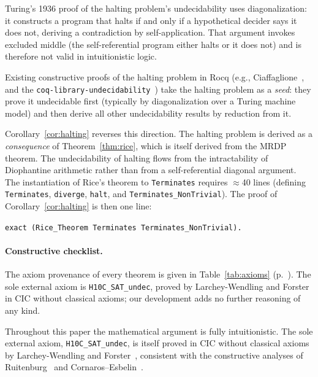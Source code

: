 \documentclass{lmcs}
\begin{document}
\begin{rem}
Turing's 1936 proof of the halting problem's undecidability uses
diagonalization: it constructs a program that halts if and only if
a hypothetical decider says it does not, deriving a contradiction
by self-application. That argument invokes excluded middle (the
self-referential program either halts or it does not) and is
therefore not valid in intuitionistic logic.

Existing constructive proofs of the halting problem in Rocq (e.g.,
Ciaffaglione~\cite{ciaffaglione2004}, and the
\texttt{coq-library-undecidability}~\cite{larchey2022}) take the
halting problem as a \emph{seed}: they prove it undecidable first
(typically by diagonalization over a Turing machine model) and then
derive all other undecidability results by reduction from it.

Corollary~\ref{cor:halting} reverses this direction. The halting
problem is derived as a \emph{consequence} of Theorem~\ref{thm:rice},
which is itself derived from the MRDP theorem. The undecidability of
halting flows from the intractability of Diophantine arithmetic rather
than from a self-referential diagonal argument. The instantiation of Rice's theorem to
\texttt{Terminates} requires $\approx$40 lines (defining
\texttt{Terminates}, \texttt{diverge}, \texttt{halt}, and
\texttt{Terminates\_NonTrivial}).
The proof of Corollary~\ref{cor:halting} is then one line:
\begin{center}
\texttt{exact (Rice\_Theorem Terminates Terminates\_NonTrivial).}
\end{center}
\end{rem}

\paragraph*{Constructive checklist.}
The axiom provenance of every theorem is given in Table~\ref{tab:axioms}
(p.~\pageref{tab:axioms}). The sole external axiom is
\texttt{H10C\_SAT\_undec}, proved by Larchey-Wendling and
Forster~\cite{larchey2022} in CIC without classical axioms; our
development adds no further reasoning of any kind.

Throughout this paper the mathematical argument is fully intuitionistic.
The sole external axiom, \texttt{H10C\_SAT\_undec}, is itself proved in
CIC without classical axioms by Larchey-Wendling and
Forster~\cite{larchey2022}, consistent with the constructive
analyses of Ruitenburg~\cite{ruitenburg1985} and Cornaros--Esbelin~\cite{cornaros1998}.
\end{document}
